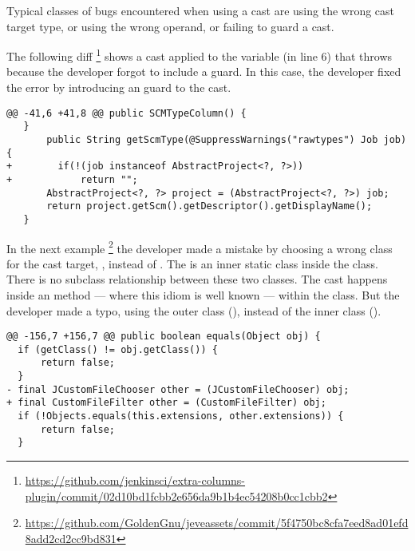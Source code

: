 Typical classes of bugs encountered when using a cast are using the wrong cast target type,
or using the wrong operand, or failing to guard a cast.



The following diff%
\footnote{\url{https://github.com/jenkinsci/extra-columns-plugin/commit/02d10bd1fcbb2e656da9b1b4ec54208b0cc1cbb2}}
shows a cast applied to the variable  (in line 6) that throws  because the developer forgot to include a guard.
In this case, the developer fixed the error by introducing an  guard to the cast.

\begin{lstlisting}[style=java]
@@ -41,6 +41,8 @@ public SCMTypeColumn() {
   }
       public String getScmType(@SuppressWarnings("rawtypes") Job job) {
+        if(!(job instanceof AbstractProject<?, ?>))
+            return "";
       AbstractProject<?, ?> project = (AbstractProject<?, ?>) job;
       return project.getScm().getDescriptor().getDisplayName();
   }
\end{lstlisting}



In the next example%
\footnote{\url{https://github.com/GoldenGnu/jeveassets/commit/5f4750bc8cfa7eed8ad01efd8add2cd2cc9bd831}}
%
%
the developer made a mistake by choosing a wrong class for the cast target,
\ie,  instead of .
The  is an inner static class inside the  class.
There is no subclass relationship between these two classes.
The cast happens inside an  method
--- where this idiom is well known ---
within the  class.
But the developer made a typo, using the outer class (), instead of the inner class ().

\begin{lstlisting}[style=java]
@@ -156,7 +156,7 @@ public boolean equals(Object obj) {
  if (getClass() != obj.getClass()) {
      return false;
  }
- final JCustomFileChooser other = (JCustomFileChooser) obj;
+ final CustomFileFilter other = (CustomFileFilter) obj;
  if (!Objects.equals(this.extensions, other.extensions)) {
      return false;
  }
\end{lstlisting}





